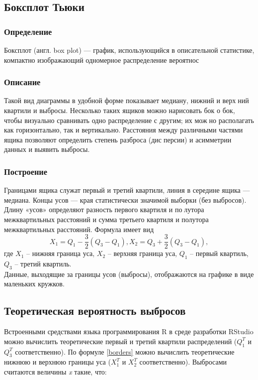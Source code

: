 \documentclass[a4paper]{article}
\begin{document}
    \subsection{Боксплот Тьюки}
        \subsubsection{Определение}
             Боксплот (англ. box plot) — график, использующийся в описательной статистике, компактно изображающий одномерное распределение вероятнос
        \subsubsection{Описание}
             Такой вид диаграммы в удобной форме показывает медиану, нижний и верхний квартили и выбросы. Несколько таких ящиков можно нарисовать бок
о бок, чтобы визуально сравнивать одно распределение с другим; их можно располагать как горизонтально, так и вертикально. Расстояния между
различными частями ящика позволяют определить степень разброса (дисперсии) и асимметрии данных и выявить выбросы.

        \subsubsection{Построение}
             Границами ящика служат первый и третий квартили, линия в середине
ящика — медиана. Концы усов — края статистически значимой выборки
(без выбросов). Длину «усов» определяют разность первого квартиля и полутора межквартильных расстояний и сумма третьего квартиля и полутора
межквартильных расстояний. Формула имеет вид
             \begin{equation} \label{borders}
                 X_1 = Q_1 - \dfrac{3}{2}(Q_3 - Q_1), X_2 = Q_3 + \dfrac{3}{2}(Q_3 - Q_1),
             \end{equation}
             где $X_1$ -- нижняя граница уса, $X_2$ -- верхняя граница уса, $Q_1$ -- первый квартиль, $Q_3$ -- третий квартиль.\\
             Данные, выходящие за границы усов (выбросы), отображаются на графике
в виде маленьких кружков.
    \subsection{Теоретическая вероятность выбросов}
        Встроенными средствами языка программирования R в среде разработки
RStudio можно вычислить теоретические первый и третий квартили распределений ($Q^T_1$ и $Q^T_3$ соответственно). По формуле \eqref{borders} можно вычислить теоретические нижнюю и верхнюю границы уса ($X^T_1$ и $X^T_2$ соответственно). Выбросами считаются величины \textit{x} такие, что:
\end{document}
